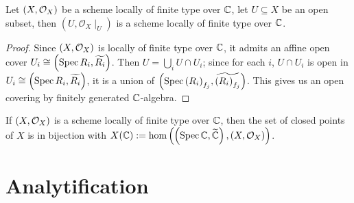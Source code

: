 \begin{proposition}
  Let $\left(X, \mathcal{O}_{X}\right)$ be a scheme locally of finite type over $\mathbb{C}$, let $U \subseteq X$ be an open subset, then $(U, \mathcal{O}_{X}\mid_{U})$ is a scheme locally of finite type over $\mathbb{C}$.
\end{proposition}
\begin{proof}
  Since $\left(X, \mathcal{O}_{X}\right)$ is locally of finite type over $\mathbb{C}$, it admits an affine open cover $U_{i}\cong\left(\operatorname*{Spec}{R_{i}}, \widetilde{R_{i}}\right)$.
  Then $U = \bigcup_{i} U \cap U_{i}$; since for each $i$, $U \cap U_{i}$ is open in $U_{i} \cong \left(\operatorname*{Spec}{R_{i}}, \widetilde{R_{i}}\right)$, it is a union of $\left(\operatorname*{Spec}{\left(R_{i}\right)_{f_{j}}}, \widetilde{\left(R_{i}\right)_{f_{j}}}\right)$. This gives us an open covering by finitely generated $\mathbb{C}$-algebra.

\end{proof}


\begin{proposition}
  If $\left(X, \mathcal{O}_{X}\right)$ is a scheme locally of finite type over $\mathbb{C}$, then the set of closed points of $X$ is in bijection with $X(\mathbb{C}) := \hom\left(\left(\operatorname*{Spec}{\mathbb{C}}, \widetilde{\mathbb{C}}\right), \left(X, \mathcal{O}_{X}\right)\right)$.
\end{proposition}


\section{Analytification}
